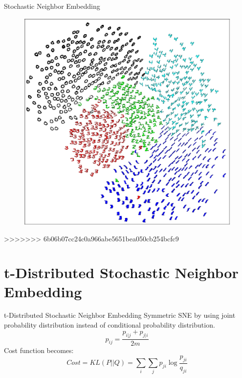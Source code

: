 \documentclass[10pt]{beamer}
\begin{document}
\begin{frame}{Stochastic Neighbor Embedding}
\begin{figure}
\centering
\includegraphics[scale=0.3]{./image/sne.eps}
\end{figure}
\end{frame}
>>>>>>> 6b06b07cc24c0a966abe5651bea050cb254bcfc9
\section{t-Distributed Stochastic Neighbor Embedding}
\begin{frame}{t-Distributed Stochastic Neighbor Embedding}
Symmetric SNE by using joint probability distribution instead of conditional probability distribution.
\begin{displaymath}
	p_{ij} = \frac{p_{i|j} + p_{j|i}}{2m}
\end{displaymath}
Cost function becomes:
\begin{displaymath}
	Cost =  KL(P||Q) = \sum_i\sum_j p_{ji} \log\frac{p_{ji}}{q_{ji}}
\end{displaymath}
\end{frame}
\end{document}
